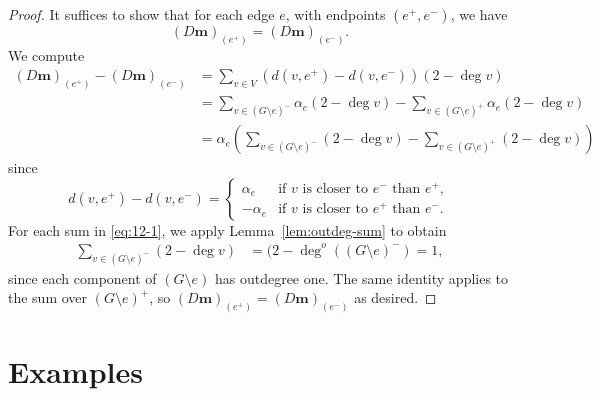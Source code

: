 \documentclass{amsart}
\theoremstyle{definition}
\newcommand{\boldm}{\mathbf{m}}
\newcommand{\degout}{\deg^o}
\newcommand{\note}[1]{{\color{red} \sf $\diamondsuit$  {#1} $\diamondsuit$ }}
\begin{document}
\begin{proof}

It suffices to show that for each edge $e$, with endpoints $(e^+,e^-)$, we have
\[ 
	(D \boldm)_{(e^+)} = (D \boldm)_{(e^-)} .
\]
We compute
\begin{align}
	(D \boldm)_{(e^+)} - (D \boldm)_{(e^-)} &= \sum_{v \in V} (d(v,e^+) - d(v,e^-)) (2 - \deg v) \\
	&= \sum_{v\in (G\setminus e)^-}  \alpha_e (2 - \deg v)  - \sum_{v\in (G\setminus e)^+} \alpha_e (2 - \deg v) \\
	&= \alpha_e \left( \sum_{v\in (G\setminus e)^-}  (2 - \deg v)  - \sum_{v\in (G\setminus e)^+} (2 - \deg v)\right) 
\label{eq:12-1}
\end{align}
since
\[
	d(v,e^+) - d(v,e^-) = \begin{cases}
	\alpha_e &\text{if $v$ is closer to $e^-$ than }e^+,\\
	- \alpha_e &\text{if $v$ is closer to $e^+$ than }e^-.
	\end{cases}
\]
For each sum in \eqref{eq:12-1}, we apply Lemma~\ref{lem:outdeg-sum} to obtain
\begin{align}
\sum_{v \in (G\setminus e)^-}  (2 - \deg v) &= (2 - \degout( (G\setminus e)^-) 
= 1 ,
\end{align}
since each component of $(G \setminus e)$ has outdegree one.
The same identity applies to the sum over $(G \setminus e)^+$, so $(D\boldm)_{(e^+)} = (D\boldm)_{(e^-)}$ as desired.
\end{proof}


\section{Examples}
\end{document}
